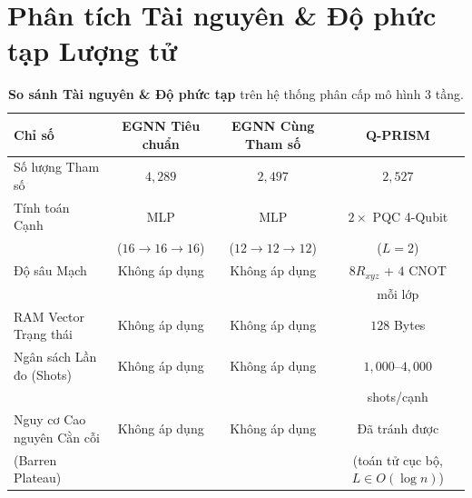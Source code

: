 \documentclass[10pt,twocolumn,letterpaper]{article}
\begin{document}
\section{Phân tích Tài nguyên \& Độ phức tạp Lượng tử}
\label{sec:resources}

\begin{table}[t]
\centering
\small
\caption{\textbf{So sánh Tài nguyên \& Độ phức tạp} trên hệ thống phân cấp mô hình 3 tầng.}
\label{tab:resources}
\begin{tabular}{lccc}
\toprule
\textbf{Chỉ số} & \textbf{EGNN Tiêu chuẩn} & \textbf{EGNN Cùng Tham số} & \textbf{Q-PRISM} \\
\midrule
Số lượng Tham số & $4{,}289$ & $2{,}497$ & $2{,}527$ \\
Tính toán Cạnh & MLP & MLP & $2 \times$ PQC 4-Qubit \\
 & ($16 \to 16 \to 16$) & ($12 \to 12 \to 12$) & ($L=2$) \\
Độ sâu Mạch & Không áp dụng & Không áp dụng & $8 R_{xyz}$ + $4$ CNOT \\
 & & & mỗi lớp \\
RAM Vector Trạng thái & Không áp dụng & Không áp dụng & $128$ Bytes \\
Ngân sách Lần đo (Shots) & Không áp dụng & Không áp dụng & $1{,}000$--$4{,}000$ \\
 & & & shots/cạnh \\
\midrule
Nguy cơ Cao nguyên Cằn cỗi & Không áp dụng & Không áp dụng & Đã tránh được \\
(Barren Plateau) \cite{McClean:2018jps, Cerezo:2020mtn} & & & (toán tử cục bộ, $L \in O(\log n)$) \\
\bottomrule
\end{tabular}
\end{table}
\end{document}
